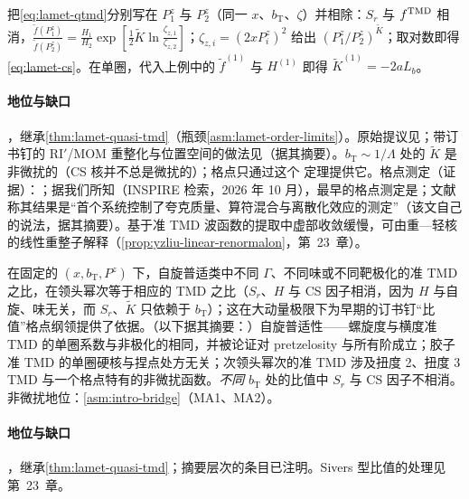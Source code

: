 \begin{proofsketch}
把\cref{eq:lamet-qtmd}分别写在 $P_1^z$ 与 $P_2^z$（同一 $x$、$b_{\mathrm T}$、$\zeta$）并相除：$S_r$ 与 $f^{\rm TMD}$ 相消，$\frac{\tilde f(P_1^z)}{\tilde f(P_2^z)}=\frac{H_1}{H_2}\exp[\frac12\tilde K\ln\frac{\zeta_{z,1}}{\zeta_{z,2}}]$；$\zeta_{z,i}=(2xP^z_i)^2$ 给出 $(P_1^z/P_2^z)^{\tilde K}$；取对数即得\cref{eq:lamet-cs}。在单圈，代入上例中的 $\tilde f^{(1)}$ 与 $H^{(1)}$ 即得 $\tilde K^{(1)}=-2aL_b$。
\end{proofsketch}

\paragraph{地位与缺口}
\tagA，继承\cref{thm:lamet-quasi-tmd}（瓶颈\cref{asm:lamet-order-limits}）。原始提议见\cite{EbertStewartZhao2019}；带订书钉的 RI$'$/MOM 重整化与位置空间的做法见\cite{Ebert:2019tvc}（据其摘要）。$b_{\mathrm T}\sim1/\Lambda$ 处的 $\tilde K$ 是非微扰的（CS 核并不总是微扰的）；格点只通过这个 \tagA 定理提供它。格点测定（证据）：\cite{Shanahan:2020zxr,Shanahan:2021tst,Schlemmer:2021aij,LatticePartonLPC:2022eev,LatticePartonLPC:2023pdv,Avkhadiev:2023poz,Avkhadiev:2024mgd,Bollweg:2024zet,Tan:2025ofx}；据我们所知（INSPIRE 检索，2026 年 10 月），最早的格点测定是\cite{Shanahan:2020zxr}；文献\cite{Avkhadiev:2024mgd}称其结果是“首个系统控制了夸克质量、算符混合与离散化效应的测定”（该文自己的说法，据其摘要）。基于准 TMD 波函数的提取中虚部收敛缓慢，可由重—轻核的线性重整子解释（\cref{prop:yzliu-linear-renormalon}，第~23~章）。

\begin{proposition}\label{prop:lamet-tmd-ratios}
在固定的 $(x,b_{\mathrm T},P^z)$ 下，自旋普适类中不同 $\Gamma$、不同味或不同靶极化的准 TMD 之比，在领头幂次等于相应的 TMD 之比（$S_r$、$H$ 与 CS 因子相消，因为 $H$ 与自旋、味无关，而 $S_r$、$\tilde K$ 只依赖于 $b_{\mathrm T}$）；这在大动量极限下为早期的订书钉“比值”格点纲领\cite{Hagler:2009mb,Musch:2010ka,Musch:2011er,Yoon:2017qzo}提供了依据\cite{Ebert:2022fmh,Vladimirov:2020ofp}。（以下据其摘要：）自旋普适性——螺旋度与横度准 TMD 的单圈系数与非极化的相同，并被论证对 pretzelosity 与所有阶成立\cite{Ebert:2020gxr}；胶子准 TMD 的单圈硬核与捏点处方无关\cite{Zhu:2022bja}；次领头幂次的准 TMD 涉及扭度 2、扭度 3 TMD 与一个格点特有的非微扰函数\cite{Rodini:2022wic}。\emph{不同} $b_{\mathrm T}$ 处的比值中 $S_r$ 与 CS 因子不相消。
非微扰地位：\cref{asm:intro-bridge}（MA1、MA2）。
\end{proposition}

\paragraph{地位与缺口}
\tagA，继承\cref{thm:lamet-quasi-tmd}；摘要层次的条目已注明。Sivers 型比值的处理见第~23~章。
